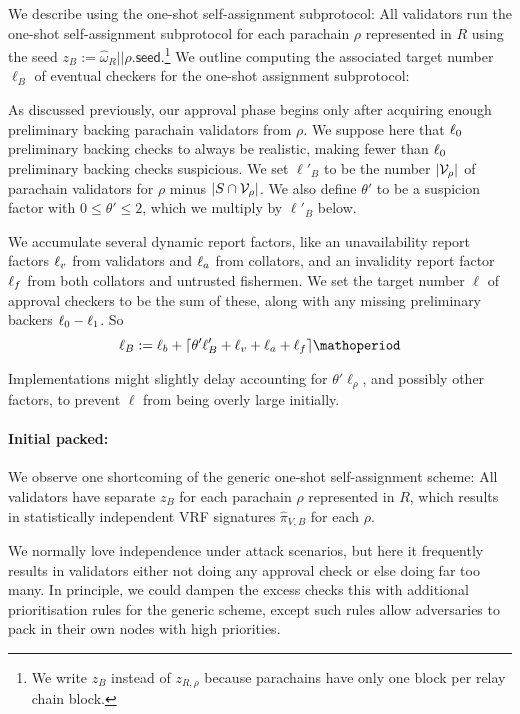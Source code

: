 \begin{enumerate}
\begin{enumerate}
We describe using the one-shot self-assignment subprotocol:  All validators run the one-shot self-assignment subprotocol for each parachain $\rho$ represented in $R$ using the seed $z_B := \hat{\omega}_R || \rho.\mathsf{seed}$.\footnote{We write $z_B$ instead of $z_{R,\rho}$ because parachains have only one block per relay chain block.}  We outline computing the associated target number $\ell_B$ of eventual checkers for the one-shot assignment subprotocol: 

As discussed previously, our approval phase begins only after acquiring enough preliminary backing parachain validators from $\rho$.  We suppose here that $\ell_0$ preliminary backing checks to always be realistic, making fewer than $\ell_0$ preliminary backing checks suspicious.  We set $\ell'_B$ to be the number $|\mathcal{V}_\rho|$ of parachain validators for $\rho$ minus $|S \cap \mathcal{V}_\rho|$. 
We also define $\theta'$ to be a suspicion factor with $0 \le \theta' \le 2$, which we multiply by $\ell'_B$ below.

We accumulate several dynamic report factors, like an unavailability report factors $\ell_v$ from validators and $\ell_a$ from collators, and an invalidity report factor $\ell_f$ from both collators and untrusted fishermen.  We set the target number $\ell$ of approval checkers to be the sum of these, along with any missing preliminary backers $\ell_0-\ell_1$.  So
$$ \ell_B := \basesecondarychecks + \lceil \theta' \ell'_B + \rfuv + \runav + \rinv \rceil \mathoperiod $$

Implementations might slightly delay accounting for $\theta' \ell_\rho$, and possibly other factors, to prevent $\ell$ from being overly large initially. 

\smallskip
\paragraph{Initial packed:}

We observe one shortcoming of the generic one-shot self-assignment scheme:  All validators have separate $z_B$ for each parachain $\rho$ represented in $R$, which results in statistically independent VRF signatures $\hat{\pi}_{V,B}$ for each $\rho$.  

We normally love independence under attack scenarios, but here it frequently results in validators either not doing any approval check or else doing far too many.  In principle, we could dampen the excess checks this with additional prioritisation rules for the generic scheme, except such rules allow adversaries to pack in their own nodes with high priorities.


\end{enumerate}
\end{enumerate}
